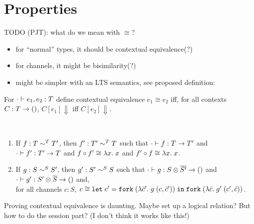 
\section{Properties}
\label{sec:properties}

TODO (PJT): what do we mean with $\cong$?
\begin{itemize}
\item for ``normal'' types, it should be contextual equivalence(?)
\item for channels, it might be bisimilarity(?)
\item might be simpler with an LTS semantics, see proposed definition:
\end{itemize}

\begin{definition}
  For $\typing[\CNil]{e_1, e_2} T$ define contextual equivalence $e_1 \cong e_2$
  iff, for all contexts $C : T \to \TUnit$, $C[e_1] \Downarrow$ iff $C[e_2] \Downarrow$. 
\end{definition}

\begin{lemma}[Conversions]~\\[-\baselineskip]
  \begin{enumerate}
    \item If $f : T \eqt T'$, then $f' : T' \eqt T$
      such that $\typing[\CNil]{f}{\TFun T{T'}}$
      and  $\typing[\CNil]{f'}{\TFun {T'}T}$
      and  $f \circ f' \cong \ELam x x$
      and  $f' \circ f \cong \ELam x x$.
    \item If $g : S \eqs S'$, then $g' : S' \eqs S$
      such that $\typing[\CNil]{g}{\TFun {\TPair {S} {\TDual{S'}}} \TUnit}$
      and $\typing[\CNil]{g'}{\TFun {\TPair {S'} {\TDual{S}}} \TUnit}$
      and,\\
      for all channels $c : S$,  $c \cong \ELet{c'}{\EFork{( \ELam {\bar c'} g \; (c, \bar c')) }}{\EFork{( \ELam {\bar c} g' \; (c', \bar c)) }} $.
\end{enumerate}
\end{lemma}

Proving contextual equivalence is daunting. Maybe set up a logical relation? But how to do the session part?
(I don't think it works like this!)

